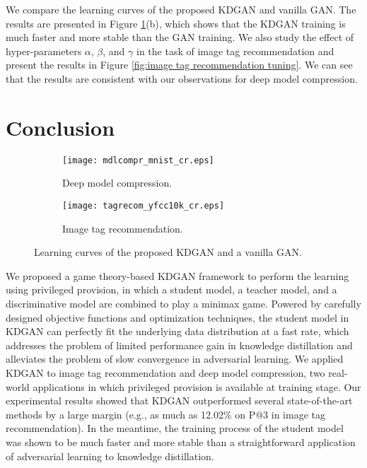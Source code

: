 \documentclass{article}
\begin{document}
We compare the learning curves of the proposed KDGAN and vanilla GAN.
The results are presented in Figure \ref{fig:learning curves}(b), which shows that the KDGAN training is much faster and more stable than the GAN training.
We also study the effect of hyper-parameters $\alpha$, $\beta$, and $\gamma$ in the task of image tag recommendation and present the results in Figure \ref{fig:image tag recommendation tuning}.
We can see that the results are consistent with our observations for deep model compression.

\section{Conclusion}

\begin{figure}[tbp]
\centering
\setlength{\abovecaptionskip}{4pt plus 0pt minus 0pt}
\begin{subfigure}{0.49\textwidth}
 \centering
 \texttt{[image: mdlcompr\_mnist\_cr.eps]}
  \caption{ Deep model compression. }
\end{subfigure}
\begin{subfigure}{0.49\textwidth}
 \centering
 \texttt{[image: tagrecom\_yfcc10k\_cr.eps]}
  \caption{ Image tag recommendation. }
\end{subfigure}
\caption{ Learning curves of the proposed KDGAN and a vanilla GAN. }
\label{fig:learning curves}
\end{figure}

We proposed a game theory-based KDGAN framework to perform the learning using privileged provision, in which a student model, a teacher model, and a discriminative model are combined to play a minimax game.
Powered by carefully designed objective functions and optimization techniques, the student model in KDGAN can perfectly fit the underlying data distribution at a fast rate, which addresses the problem of limited performance gain in knowledge distillation and alleviates the problem of slow convergence in adversarial learning.
We applied KDGAN to image tag recommendation and deep model compression, two real-world applications in which privileged provision is available at training stage.
Our experimental results showed that KDGAN outperformed several state-of-the-art methods by a large margin (e.g., as much as 12.02\% on P@3 in image tag recommendation).
In the meantime, the training process of the student model was shown to be much faster and more stable than a straightforward application of adversarial learning to knowledge distillation.
\end{document}
